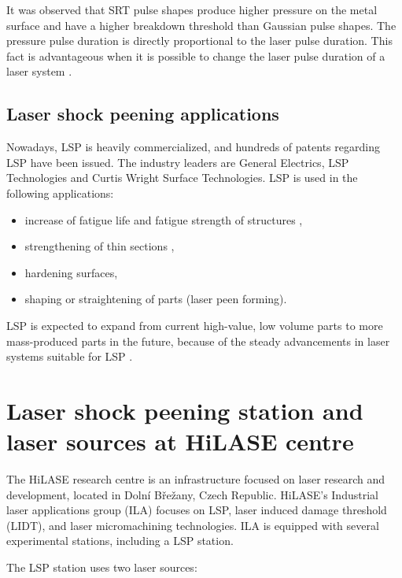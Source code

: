It was observed that SRT pulse shapes produce higher pressure on the metal surface and have a higher breakdown threshold than Gaussian pulse shapes. The pressure pulse duration is directly proportional to the laser pulse duration.  This fact is advantageous when it is possible to change the laser pulse duration of a laser system \cite{devaux_fabbro_tollier_bartnicki_1993}. 


\subsection{Laser shock peening applications}

Nowadays, LSP is heavily commercialized, and hundreds of patents regarding LSP have been issued. The industry leaders are General Electrics, LSP Technologies and Curtis Wright Surface Technologies. LSP is used in the following applications:

\begin{itemize}
 
    \item increase of fatigue life and fatigue strength of structures \cite{dane_hackel_daly_harrisson_2000},
    \item strengthening of thin sections \cite{vaccari_1992},
    \item hardening surfaces,
    \item shaping or straightening of parts  (laser peen forming).

\end{itemize}

LSP is expected to expand from current high-value, low volume parts to more mass-produced parts in the future, because of the steady advancements in laser systems suitable for LSP \cite{clauer_2019}. 



\section{Laser shock peening station and laser sources at HiLASE centre}

The HiLASE research centre is an infrastructure focused on laser research and development, located in Dolní Břežany, Czech Republic. HiLASE's Industrial laser applications group (ILA) focuses on LSP, laser induced damage threshold (LIDT), and laser micromachining technologies. ILA is equipped with several experimental stations, including a LSP station. 

The LSP station uses two laser sources:

